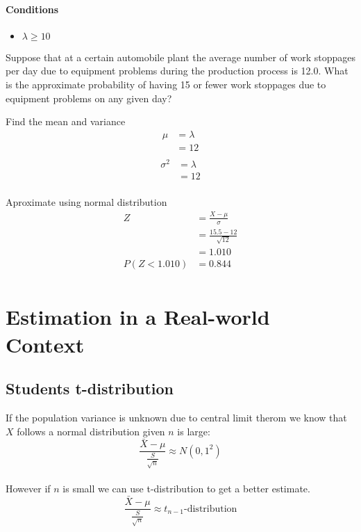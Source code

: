         \paragraph{Conditions}
        \begin{itemize}
            \item $\lambda \geq 10$
        \end{itemize}

        \begin{example}
        {
            Suppose that at a certain automobile plant the average number of work stoppages per day due to equipment problems during the production process is 12.0. What is the approximate probability of having 15 or fewer work stoppages due to equipment problems on any given day?
        }

        \begin{step}{Find the mean and variance}
        \begin{align*}
        \mu &= \lambda\\
        &= 12\\
        \end{align*}
        \begin{align*}
        \sigma^2 &= \lambda\\
        &= 12\\
        \end{align*}
        \end{step}

        \begin{step}{Aproximate using normal distribution}
        \begin{align*}
        Z &= \frac{X - \mu}{\sigma} \\
        &=\frac{15.5 - 12}{\sqrt{12}}\\
        &= 1.010\\
        P(Z < 1.010) &= 0.844\\
        \end{align*}
        \end{step}

        \end{example}

\newpage
\section{Estimation in a Real-world Context}

    \newpage
    \subsection{Students t-distribution}
        If the population variance is unknown due to central limit therom we know that $X$ follows a normal distribution given $n$ is large:
        $$\frac{\bar{X} - \mu}{\displaystyle\frac{S}{\sqrt{n}}} \approx N(0, 1^2)$$
        \\
        However if $n$ is small we can use t-distribution to get a better estimate. 
        $$\frac{\bar{X} - \mu}{\displaystyle\frac{S}{\sqrt{n}}} \approx t_{n-1}\text{-distribution}$$

